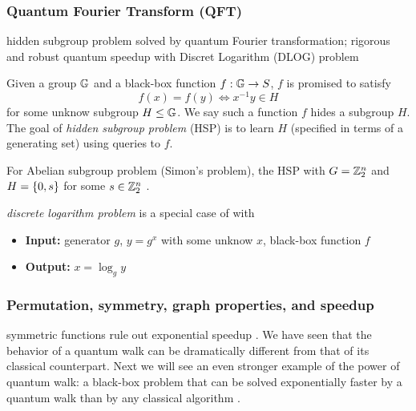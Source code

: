 \subsubsection{Quantum Fourier Transform (QFT)}
hidden subgroup problem solved by quantum Fourier transformation\cite{childsQuantumAlgorithmsAlgebraic2010};
rigorous and robust quantum speedup with Discret Logarithm (DLOG) problem \cite{liuRigorousRobustQuantum2021}
\begin{definition}\label{prm:hidden_subgroup}
	Given a group $\mathbb{G}$ and a black-box function $f:\mathbb{G}\to S$, 
	$f$ is promised to satisfy 
	\begin{equation}
		f(x) =f(y) \iff x^{-1}y \in H
	\end{equation}
	for some unknow subgroup $H\le \mathbb{G}$.
	We say such a function $f$ hides a subgroup $H$.
	The goal of \emph{hidden subgroup problem} (HSP) is to learn $H$
	(specified in terms of a generating set) using queries to $f$.
\end{definition}
\begin{remark}
	For Abelian subgroup problem (Simon's problem), the HSP with $G = \mathbb{Z}^n_2$ and $H = \qty{ 0, s }$ for some $s \in \mathbb{Z}_2^n$ .
\end{remark}
\begin{definition}\label{prm:dlog}
	\emph{discrete logarithm problem} is a special case of  with 
	\begin{itemize}
		\item \textbf{Input:} generator $g$, $y=g^x$ with some unknow $x$, black-box function $f$
		\item \textbf{Output:} $x=\log_g y$
	\end{itemize}
\end{definition}

\subsubsection{Permutation, symmetry, graph properties, and speedup}
symmetric functions rule out exponential speedup
\cite{ben-davidSymmetriesGraphProperties2020}.
We have seen that the behavior of a quantum walk can be dramatically different from that of its classical counterpart. Next we will see an even stronger example of the power of quantum walk: a black-box problem that can be solved exponentially faster by a quantum walk than by any classical algorithm \cite{childsExponentialAlgorithmicSpeedup2003}.

